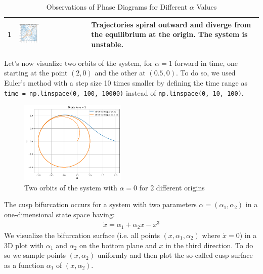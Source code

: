 \begin{table}[H]
\begin{tabular}{|c|>{\centering\arraybackslash}m{}|>{\centering\arraybackslash}m{}|}
    \hline
    1 & \includegraphics[width=0.31\textwidth]{images/task3/A-H_bifurcation_1.png} & Trajectories spiral outward and diverge from the equilibrium at the origin. The system is unstable.\\
    \hline
    \end{tabular}
    \caption{Observations of Phase Diagrams for Different $\alpha$ Values}
    \label{tab:task3_phase_diagrams}
\end{table}

Let's now visualize two orbits of the system, for $\alpha=1$ forward in time, one starting at the
point $(2, 0)$ and the other at $(0.5, 0)$. To do so, we used Euler’s method with a step size 10 times smaller by defining the time range as \texttt{time = np.linspace(0, 100, 10000)} instead of \texttt{np.linspace(0, 10, 100)}.
\begin{figure} [H]
    \centering
    \includegraphics[width=0.45\textwidth]{images/task3/orbits.png}
    \caption{Two orbits of the system with $\alpha=0$ for 2 different origins}
    \label{fig:task3_orbits}
\end{figure}



The cusp bifurcation occurs for a system with two parameters $\alpha=(\alpha_1, \alpha_2)$ in a one-dimensional state space having:
\begin{align*}
    \dot{x} = \alpha_1 + \alpha_2 x - x^3
\end{align*}
We visualize the bifurcation surface (i.e. all points $(x, \alpha_1, \alpha_2)$ where $\dot{x} = 0$) in a 3D plot with $\alpha_1$ and $\alpha_2$ on the bottom plane and $x$ in the third direction. To do so we  sample points $(x, \alpha_2)$ uniformly and then plot the so-called cusp surface as a function $\alpha_1$ of $(x, \alpha_2)$.

